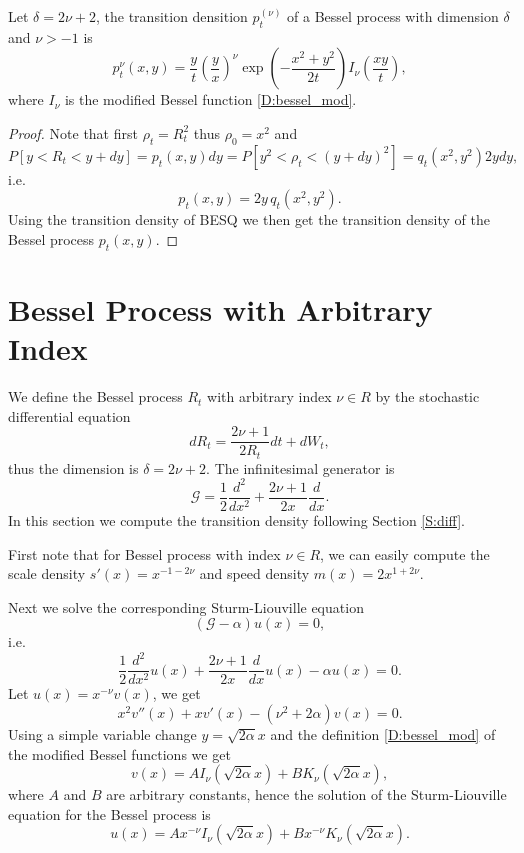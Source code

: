 \begin{proposition}
Let $\delta=2\nu+2$, the transition densition $p_t^{(\nu)}$ of a Bessel process
with dimension $\delta$ and $\nu>-1$ is
\begin{equation}
  p_t^{\nu}(x,y) = \frac{y}{t} \left(\frac{y}{x}\right)^{\nu}
    \exp\left( -\frac{x^2+y^2}{2t} \right)  I_{\nu}\left(\frac{xy}{t}\right),
\end{equation}
where $I_{\nu}$ is the modified Bessel function \ref{D:bessel_mod}.
\begin{proof}
Note that first $\rho_t=R_t^2$ thus $\rho_0=x^2$ and
\[
  P[y<R_t<y+dy]=p_t(x,y)dy = P[y^2<\rho_t<(y+dy)^2]=q_t(x^2,y^2) 2ydy,
\]
i.e.
\begin{equation} \label{E:bes_besq}
  p_t(x,y) = 2y \, q_t(x^2,y^2).
\end{equation}
Using the transition density of BESQ we then get the transition density of the
Bessel process $p_t(x,y)$.
\end{proof}
\end{proposition}


\section{Bessel Process with Arbitrary Index}

We define the Bessel process $R_t$ with arbitrary index $\nu\in R$ by the
stochastic differential equation
\begin{equation}
  dR_t = \frac{2\nu+1}{2R_t} dt + dW_t,
\end{equation}
thus the dimension is $\delta=2\nu+2$. The infinitesimal generator is
\begin{equation}
  \mathcal{G} = \frac{1}{2} \frac{d^2}{dx^2} + \frac{2\nu+1}{2x} \frac{d}{dx}.
\end{equation}
In this section we compute the transition density following Section
\ref{S:diff}.

First note that for Bessel process with index $\nu\in R$, we can easily compute
the scale density $s'(x)=x^{-1-2\nu}$ and speed density $m(x)=2x^{1+2\nu}$.

Next we solve the corresponding Sturm-Liouville equation
\[
  (\mathcal{G}-\alpha) u(x) = 0,
\]
i.e.
\[
  \frac{1}{2} \frac{d^2}{dx^2} u(x) + \frac{2\nu+1}{2x} \frac{d}{dx} u(x)
    - \alpha u(x) = 0.
\]
Let $u(x)=x^{-\nu} v(x)$, we get
\[
  x^2 v''(x) + x v'(x) - (\nu^2+2\alpha) v(x) = 0.
\]
Using a simple variable change $y=\sqrt{2\alpha} x$ and the definition 
\ref{D:bessel_mod} of the modified Bessel functions we get
\[
  v(x) = A I_{\nu}(\sqrt{2\alpha}x) + B K_{\nu}(\sqrt{2\alpha}x),
\]
where $A$ and $B$ are arbitrary constants, hence the solution of the
Sturm-Liouville equation for the Bessel process is
\[
  u(x) = A x^{-\nu} I_{\nu}(\sqrt{2\alpha}x) + 
         B x^{-\nu} K_{\nu}(\sqrt{2\alpha}x).
\]

